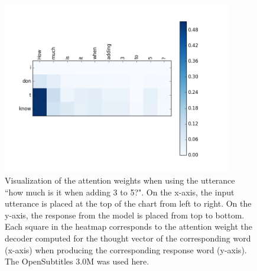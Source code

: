 \begin{figure}[H]
	\centering
	\includegraphics[width=10cm]{img/attention/attention_visualization2_OpenSubtitle-3M.png}
	\caption{Visualization of the attention weights when using the utterance ``how much is it when adding 3 to 5?". On the x-axis, the input utterance is placed at the top of the chart from left to right. On the y-axis, the response from the model is placed from top to bottom. Each square in the heatmap corresponds to the attention weight the decoder computed for the thought vector of the corresponding word (x-axis) when producing the corresponding response word (y-axis). The OpenSubtitles 3.0M was used here.}
	\label{results:attention:example2:opensubtitles-3M}
\end{figure}

